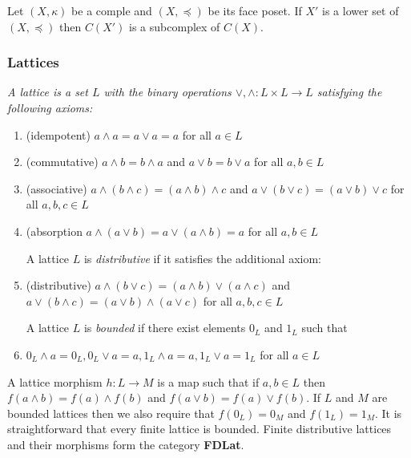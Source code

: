 \begin{prop}\label{cor:clsubcomplex}
Let $(X,\kappa)$ be a comple and  $(X,\preceq)$ be its face poset.  If $X'$ is a lower set of $(X,\preceq)$ then $C(X')$ is a subcomplex of $C(X)$.
\end{prop}



\subsubsection{Lattices}

\begin{defn}
{\em
A {\em lattice} is a set $L$ with the binary operations $\vee,\wedge:L\times L\to L$ satisfying the following axioms:

\begin{enumerate}
\item (idempotent) $a\wedge a = a \vee a = a$ for all $a\in L$
\item (commutative) $a\wedge b = b\wedge a$ and $a\vee b = b \vee a$ for all $a,b\in L$
\item (associative) $a\wedge (b\wedge c) = (a\wedge b)\wedge c$ and $a\vee(b\vee c) = (a\vee b)\vee c$ for all $a,b,c\in L$
\item (absorption $a\wedge (a\vee b) = a\vee (a\wedge b)=a$ for all $a,b\in L$

A lattice $L$ is {\em distributive} if it satisfies the additional axiom:

\item (distributive) $a\wedge (b\vee c) = (a\wedge b)\vee (a\wedge c)$ and $a\vee (b\wedge c) = (a\vee b) \wedge (a\vee c)$ for all $a,b,c\in L$

A lattice $L$ is {\em bounded} if there exist elements $0_L$ and $1_L$ such that

\item $0_L\wedge a = 0_L, 0_L\vee a = a, 1_L\wedge a = a, 1_L\vee a = 1_L$ for all $a\in L$
\end{enumerate}
}
\end{defn}

A lattice morphism $h:L\to M$ is a map such that if $a,b\in L$ then $f(a\wedge b) = f(a)\wedge f(b)$ and $f(a\vee b) = f(a)\vee f(b)$.  If $L$ and $M$ are bounded lattices then we also require that $f(0_L)=0_M$ and $f(1_L)=1_M$.    It is straightforward that every finite lattice is bounded. Finite distributive lattices and their morphisms form the category {\bf FDLat}.

